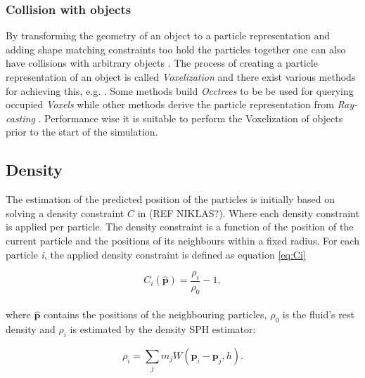 \subsubsection{Collision with objects}

By transforming the geometry of an object to a particle representation and adding shape matching constraints too hold the particles together one can also have collisions with arbitrary objects \cite{muller2005meshless, macklin2014unified}. The process of creating a particle representation of an object is called \textit{Voxelization} and there exist various methods for achieving this, e.g. \cite{VoxPolygon, VoxSingle}. Some methods build \textit{Occtrees} to be be used for querying occupied \textit{Voxels} while other methods derive the particle representation from \textit{Ray-casting} \cite{VoxSingle}. Performance wise it is suitable to perform the Voxelization of objects prior to the start of the simulation.


\subsection{Density}

The estimation of the predicted position of the particles is initially based on solving a density constraint $C$ in (REF NIKLAS?). Where each density constraint is applied per particle. The density constraint is a function of the position of the current particle and the positions of its neighbours within a fixed radius. For each particle \textit{i}, the applied density constraint is defined as equation \ref{eq:Ci}

\begin{equation}
\label{eq:Ci}
C_i(\hat{\mathbf{p}}) = \frac{\rho_i}{\rho_0} - 1,
\end{equation}
\\
where $\hat{\mathbf{p}}$ contains the positions of the neighbouring particles, $\rho_0$ is the fluid's rest density and $\rho_i$ is estimated by the density SPH estimator:

\begin{equation}
\label{eq:Rhoi}
\rho_i = \sum\limits_{j} m_j W(\mathbf{p}_i - \mathbf{p}_j, h).
\end{equation}

